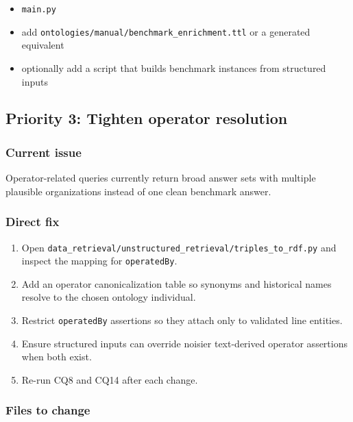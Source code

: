 \documentclass[
  11pt,
  a4paper,
]{article}
\providecommand{\tightlist}{%
  \setlength{\itemsep}{0pt}\setlength{\parskip}{0pt}}
\begin{document}
\begin{itemize}
\tightlist
\item
  \texttt{main.py}
\item
  add \texttt{ontologies/manual/benchmark\_enrichment.ttl} or a
  generated equivalent
\item
  optionally add a script that builds benchmark instances from
  structured inputs
\end{itemize}

\subsection{Priority 3: Tighten operator
resolution}\label{priority-3-tighten-operator-resolution}

\subsubsection{Current issue}\label{current-issue-2}

Operator-related queries currently return broad answer sets with
multiple plausible organizations instead of one clean benchmark answer.

\subsubsection{Direct fix}\label{direct-fix-2}

\begin{enumerate}
\def\labelenumi{\arabic{enumi}.}
\tightlist
\item
  Open
  \texttt{data\_retrieval/unstructured\_retrieval/triples\_to\_rdf.py}
  and inspect the mapping for \texttt{operatedBy}.
\item
  Add an operator canonicalization table so synonyms and historical
  names resolve to the chosen ontology individual.
\item
  Restrict \texttt{operatedBy} assertions so they attach only to
  validated line entities.
\item
  Ensure structured inputs can override noisier text-derived operator
  assertions when both exist.
\item
  Re-run CQ8 and CQ14 after each change.
\end{enumerate}

\subsubsection{Files to change}\label{files-to-change-2}
\end{document}
